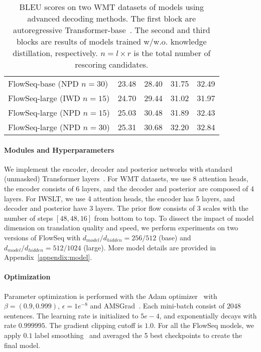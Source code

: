 \documentclass[11pt,a4paper]{article}
\begin{document}
\begin{table}[t]
{\begin{tabular}{lcccc}
FlowSeq-base (NPD $n=30$) & 23.48 & 28.40 & 31.75 & 32.49 \\
\hdashline
FlowSeq-large (IWD $n=15$) & 24.70  & 29.44 & 31.02 & 31.97 \\
FlowSeq-large (NPD $n=15$) & 25.03 & 30.48 & 31.89 & 32.43 \\
FlowSeq-large (NPD $n=30$) & 25.31 & 30.68 & 32.20 & 32.84 \\
\bottomrule
\end{tabular}
}
\caption{BLEU scores on two WMT datasets of models using advanced decoding methods. 
The first block are autoregressive Transformer-base~\citep{vaswani2017attention}.
The second and third blocks are results of models trained w/w.o. knowledge distillation, respectively.
$n=l\times r$ is the total number of rescoring candidates.}
\label{tab:refine}
\vspace{-4mm}
\end{table}

\paragraph{Modules and Hyperparameters}
We implement the encoder, decoder and posterior networks with standard (unmasked) Transformer layers~\citep{vaswani2017attention}.
For WMT datasets, we use 8 attention heads, the encoder consists of 6 layers, and the decoder and posterior are composed of 4 layers.
For IWSLT, we use 4 attention heads, the encoder has 5 layers, and decoder and posterior have 3 layers.
The prior flow consists of 3 scales with the number of steps $[48, 48, 16]$ from bottom to top.
To dissect the impact of model dimension on translation quality and speed, we perform experiments on two versions of FlowSeq with $d_{model}/d_{hidden} = 256/512$ (base) and $d_{model}/d_{hidden} = 512/1024$ (large).
More model details are provided in Appendix~\ref{appendix:model}.

\paragraph{Optimization}
Parameter optimization is performed with the Adam optimizer~\citep{kingma2014adam} with $\beta=(0.9, 0.999)$,  $\epsilon=1e^{-8}$ and AMSGrad~\citep{iclr2018amsgrad}. 
Each mini-batch consist of $2048$ sentences.
The learning rate is initialized to $5e-4$, and exponentially decays with rate $0.999995$.
The gradient clipping cutoff is $1.0$.
For all the FlowSeq models, we apply $0.1$ label smoothing~\citep{vaswani2017attention} and averaged the 5 best checkpoints to create the final model.
\end{document}

